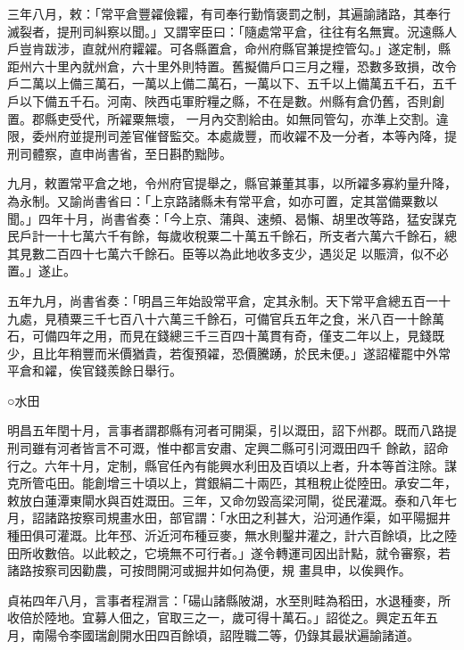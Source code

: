 \begin{pinyinscope}
 三年八月，敕：「常平倉豐糴儉糶，有司奉行勤惰褒罰之制，其遍諭諸路，其奉行滅裂者，提刑司糾察以聞。」又謂宰臣曰：「隨處常平倉，往往有名無實。況遠縣人戶豈肯跋涉，直就州府糶糴。可各縣置倉，命州府縣官兼提控管勾。」遂定制，縣距州六十里內就州倉，六十里外則特置。舊擬備戶口三月之糧，恐數多致損，改令戶二萬以上備三萬石，一萬以上備二萬石，一萬以下、五千以上備萬五千石，五千戶以下備五千石。河南、陜西屯軍貯糧之縣，不在是數。州縣有倉仍舊，否則創置。郡縣吏受代，所糴粟無壞，
 一月內交割給由。如無同管勾，亦準上交割。違限，委州府並提刑司差官催督監交。本處歲豐，而收糴不及一分者，本等內降，提刑司體察，直申尚書省，至日斟酌黜陟。



 九月，敕置常平倉之地，令州府官提舉之，縣官兼董其事，以所糴多寡約量升降，為永制。又諭尚書省曰：「上京路諸縣未有常平倉，如亦可置，定其當備粟數以聞。」四年十月，尚書省奏：「今上京、蒲與、速頻、曷懶、胡里改等路，猛安謀克民戶計一十七萬六千有餘，每歲收稅粟二十萬五千餘石，所支者六萬六千餘石，總其見數二百四十七萬六千餘石。臣等以為此地收多支少，遇災足
 以賑濟，似不必置。」遂止。



 五年九月，尚書省奏：「明昌三年始設常平倉，定其永制。天下常平倉總五百一十九處，見積粟三千七百八十六萬三千餘石，可備官兵五年之食，米八百一十餘萬石，可備四年之用，而見在錢總三千三百四十萬貫有奇，僅支二年以上，見錢既少，且比年稍豐而米價猶貴，若復預糴，恐價騰踴，於民未便。」遂詔權罷中外常平倉和糴，俟官錢羨餘日舉行。



 ○水田



 明昌五年閏十月，言事者謂郡縣有河者可開渠，引以溉田，詔下州郡。既而八路提刑司雖有河者皆言不可溉，惟中都言安肅、定興二縣可引河溉田四千
 餘畝，詔命行之。六年十月，定制，縣官任內有能興水利田及百頃以上者，升本等首注除。謀克所管屯田。能創增三十頃以上，賞銀絹二十兩匹，其租稅止從陸田。承安二年，敕放白蓮潭東閘水與百姓溉田。三年，又命勿毀高梁河閘，從民灌溉。泰和八年七月，詔諸路按察司規畫水田，部官謂：「水田之利甚大，沿河通作渠，如平陽掘井種田俱可灌溉。比年邳、沂近河布種豆麥，無水則鑿井灌之，計六百餘頃，比之陸田所收數倍。以此較之，它境無不可行者。」遂令轉運司因出計點，就令審察，若諸路按察司因勸農，可按問開河或掘井如何為便，規
 畫具申，以俟興作。



 貞祐四年八月，言事者程淵言：「碭山諸縣陂湖，水至則畦為稻田，水退種麥，所收倍於陸地。宜募人佃之，官取三之一，歲可得十萬石。」詔從之。興定五年五月，南陽令李國瑞創開水田四百餘頃，詔陞職二等，仍錄其最狀遍諭諸道。




\end{pinyinscope}
